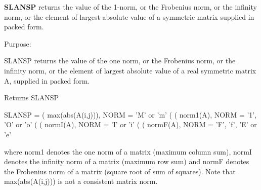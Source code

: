 {\bfseries S\+L\+A\+N\+S\+P} returns the value of the 1-\/norm, or the Frobenius norm, or the infinity norm, or the element of largest absolute value of a symmetric matrix supplied in packed form. 

 \begin{DoxyParagraph}{Purpose\+: }
\begin{DoxyVerb} SLANSP  returns the value of the one norm,  or the Frobenius norm, or
 the  infinity norm,  or the  element of  largest absolute value  of a
 real symmetric matrix A,  supplied in packed form.\end{DoxyVerb}

\end{DoxyParagraph}
\begin{DoxyReturn}{Returns}
S\+L\+A\+N\+S\+P \begin{DoxyVerb}    SLANSP = ( max(abs(A(i,j))), NORM = 'M' or 'm'
             (
             ( norm1(A),         NORM = '1', 'O' or 'o'
             (
             ( normI(A),         NORM = 'I' or 'i'
             (
             ( normF(A),         NORM = 'F', 'f', 'E' or 'e'

 where  norm1  denotes the  one norm of a matrix (maximum column sum),
 normI  denotes the  infinity norm  of a matrix  (maximum row sum) and
 normF  denotes the  Frobenius norm of a matrix (square root of sum of
 squares).  Note that  max(abs(A(i,j)))  is not a consistent matrix norm.\end{DoxyVerb}
 
\end{DoxyReturn}

